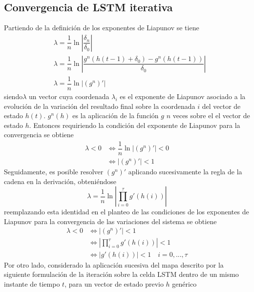 \documentclass{article}
\begin{document}
	\pagebreak
	\appendix
	\begin{appendices}
		\section{Convergencia de LSTM iterativa} \label{iterativeLSTMconvergence}
		Partiendo de la definición de los exponentes de Liapunov se tiene
		\begin{equation*}
		\begin{split}
		&\lambda = \dfrac{1}{n} \ln\left\lvert\dfrac{\delta_n}{\delta_0}\right\rvert\\
		&\lambda = \dfrac{1}{n} \ln \left\lvert \dfrac{g^n(h(t-1) + \delta_0) - g^n(h(t-1))}{\delta_0} \right\rvert\\
		&\lambda = \dfrac{1}{n} \ln | (g^n)' |
		\end{split}
		\end{equation*}
		siendo$\lambda$ un vector cuya coordenada $\lambda_i$ es el exponente de Liapunov asociado a la evolución de la variación del resultado final sobre la coordenada $i$ del vector de estado $h(t)$. $g^n(h)$ es la aplicación de la función $g$ $n$ veces sobre el el vector de estado $h$. Entonces requiriendo la condición del exponente de Liapunov para la convergencia se obtiene
		\begin{equation*}
		\begin{split}
		\lambda < 0 &\iff \dfrac{1}{n} \ln | (g^n)' | < 0\\
		&\iff | (g^n)' | < 1
		\end{split}
		\end{equation*}
		Seguidamente, es posible resolver $(g^n)'$ aplicando sucesivamente la regla de la cadena en la derivación, obteniéndose
		\begin{equation*}
		\lambda = \dfrac{1}{n} \ln \left\lvert  \prod_{i = 0}^{\tau}g'(h(i)) \right\rvert 
		\end{equation*}
		reemplazando esta identidad en el planteo de las condiciones de los exponentes de Liapunov para la convergencia de las variaciones del sistema se obtiene
		\begin{equation*}
		\begin{split}
		\lambda < 0 &\iff | (g^n)' | < 1\\
		&\iff  \left\lvert  \prod_{i = 0}^{\tau}g'(h(i)) \right\rvert < 1\\
		&\iff  |g'(h(i))|  < 1 \quad i = 0, ... , \tau
		\end{split}
		\end{equation*}
		Por otro lado, considerado la aplicación sucesiva del mapa descrito por la siguiente formulación de la iteración sobre la celda LSTM dentro de un mismo instante de tiempo $t$, para un vector de estado previo $h$ genérico

\end{appendices}
\end{document}
